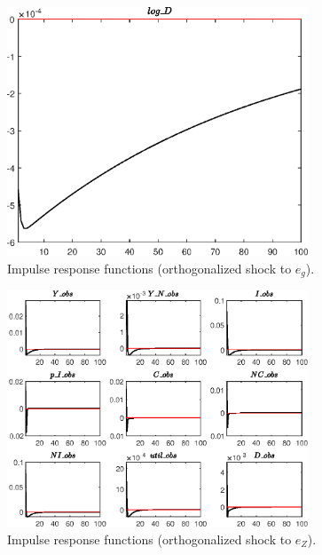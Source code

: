 \begin{figure}[H]
\centering 
\includegraphics[width=0.80\textwidth]{BRS_growth_util/graphs/BRS_growth_util_IRF_e_g3}
\caption{Impulse response functions (orthogonalized shock to ${e_g}$).}\label{Fig:IRF:e_g:3}
\end{figure}
 
\begin{figure}[H]
\centering 
\includegraphics[width=0.80\textwidth]{BRS_growth_util/graphs/BRS_growth_util_IRF_e_Z1}
\caption{Impulse response functions (orthogonalized shock to ${e_Z}$).}\label{Fig:IRF:e_Z:1}
\end{figure}
 
